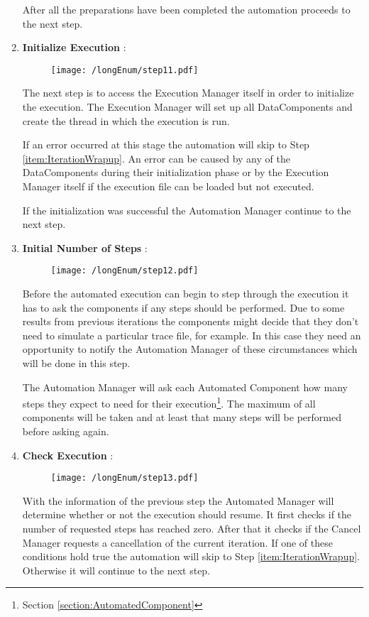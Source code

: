 \begin{enumerate}
After all the preparations have been completed the automation proceeds to the next
step.
 
 \item \label{item:initExecution} \textbf{Initialize Execution} :
\begin{figure}[H]
  \centering
  \texttt{[image: /longEnum/step11.pdf]}
\end{figure}
The next step is to access the Execution Manager
itself in order to initialize the execution. The Execution Manager will set up all
DataComponents and create the thread in which the execution is run.

If an error occurred at this stage the automation will skip to Step \ref{item:IterationWrapup}.
An error can be caused by any of the DataComponents during their initialization phase or
by the Execution Manager itself if the execution file can be loaded but not executed.

If the initialization was successful the Automation Manager continue to the next step.

 \item \label{item:askForSteps1} \textbf{Initial Number of Steps} :
\begin{figure}[H]
  \centering
  \texttt{[image: /longEnum/step12.pdf]}
\end{figure}
Before the automated execution can begin to step through
the execution it has to ask the components if any steps should be performed. Due to some results
from previous iterations the components might decide that they don't need to simulate a particular
trace file, for example. In this case they need an opportunity to notify the Automation Manager
of these circumstances which will be done in this step.

The Automation Manager will ask each Automated Component how many steps they expect to
need for their execution\footnote{Section \ref{section:AutomatedComponent}}. The maximum of
all components will be taken and at least that many steps will be performed before asking again.

 \item \label{item:checkExecution} \textbf{Check Execution} :
\begin{figure}[H]
  \centering
  \texttt{[image: /longEnum/step13.pdf]}
\end{figure}
With the information of the previous step the Automated Manager
will determine whether or not the execution should resume. It first checks if the number of requested
steps has reached zero. After that it checks if the Cancel Manager requests a cancellation
of the current iteration. If one of these conditions hold true the automation will skip to
Step \ref{item:IterationWrapup}. Otherwise it will continue to the next step.


\end{enumerate}
